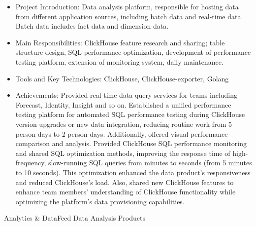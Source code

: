\documentclass{resume}
\begin{document}
\begin{itemize}
\item Project Introduction: Data analysis platform, responsible for hosting data from different application sources, including batch data and real-time data. Batch data includes fact data and dimension data.
\item Main Responsibilities: ClickHouse feature research and sharing; table structure design, SQL performance optimization, development of performance testing platform, extension of monitoring system, daily maintenance.
\item Tools and Key Technologies: ClickHouse, ClickHouse-exporter, Golang
\item Achievements: Provided real-time data query services for teams including Forecast, Identity, Insight and so on. Established a unified performance testing platform for automated SQL performance testing during ClickHouse version upgrades or new data integration, reducing routine work from 5 person-days to 2 person-days. Additionally, offered visual performance comparison and analysis. Provided ClickHouse SQL performance monitoring and shared SQL optimization methods, improving the response time of high-frequency, slow-running SQL queries from minutes to seconds (from 5 minutes to 10 seconds). This optimization enhanced the data product's responsiveness and reduced ClickHouse's load. Also, shared new ClickHouse features to enhance team members' understanding of ClickHouse functionality while optimizing the platform's data provisioning capabilities.
\end{itemize}
Analytics \& DataFeed Data Analysis Products
\end{document}
